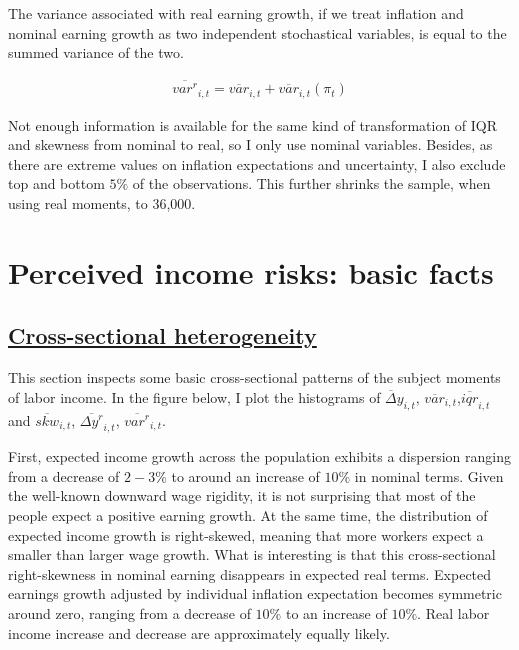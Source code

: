 \documentclass[12pt,notitlepage,onecolumn,aps,pra]{revtex4-1}
\begin{document}
The variance associated with real earning growth, if we treat inflation
and nominal earning growth as two independent stochastical variables, is
equal to the summed variance of the two.

\begin{eqnarray}
\overline{var^{r}}_{i,t} = \overline{var}_{i,t} + \overline{var}_{i,t}(\pi_{t})
\end{eqnarray}

Not enough information is available for the same kind of transformation
of IQR and skewness from nominal to real, so I only use nominal
variables. Besides, as there are extreme values on inflation
expectations and uncertainty, I also exclude top and bottom \(5\%\) of
the observations. This further shrinks the sample, when using real
moments, to 36,000.

    \hypertarget{perceived-income-risks-basic-facts}{%
\section{Perceived income risks: basic
facts}\label{perceived-income-risks-basic-facts}}

\hypertarget{cross-sectional-heterogeneity}{%
\subsection{\texorpdfstring{\href{MacroRiskProfile.ipynb}{Cross-sectional
heterogeneity}}{Cross-sectional heterogeneity}}\label{cross-sectional-heterogeneity}}

This section inspects some basic cross-sectional patterns of the subject
moments of labor income. In the figure below, I plot the histograms of
\(\overline\Delta y_{i,t}\),
\(\overline{var}_{i,t}\),\(\overline{iqr}_{i,t}\) and
\(\overline {skw}_{i,t}\), \(\overline {\Delta y^{r}}_{i,t}\),
\(\overline{var^{r}}_{i,t}\).

First, expected income growth across the population exhibits a
dispersion ranging from a decrease of \(2-3\%\) to around an increase of
\(10\%\) in nominal terms. Given the well-known downward wage rigidity,
it is not surprising that most of the people expect a positive earning
growth. At the same time, the distribution of expected income growth is
right-skewed, meaning that more workers expect a smaller than larger
wage growth. What is interesting is that this cross-sectional
right-skewness in nominal earning disappears in expected real terms.
Expected earnings growth adjusted by individual inflation expectation
becomes symmetric around zero, ranging from a decrease of \(10\%\) to an
increase of \(10\%\). Real labor income increase and decrease are
approximately equally likely.
\end{document}
